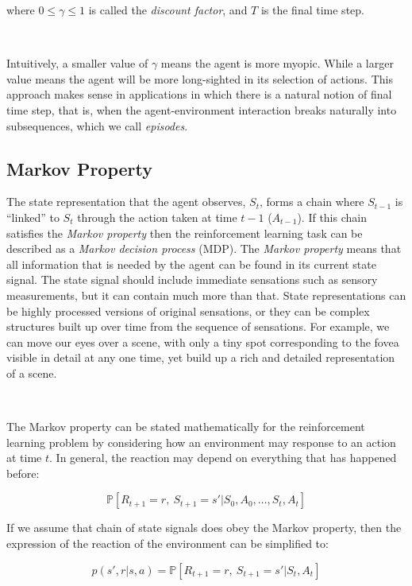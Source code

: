 \documentclass{article}
\begin{document}
where $0 \leq \gamma \leq 1$ is called the \textit{discount factor}, and $T$ is the final time step.

\

Intuitively, a smaller value of $\gamma$ means the agent is more myopic. While a larger value means the agent will be more long-sighted in its selection of actions. This approach makes sense in applications in which there is a natural notion of final time step, that is, when the agent-environment interaction breaks naturally into subsequences, which we call \textit{episodes}.

\subsection{Markov Property}

 The state representation that the agent observes, $S_t$, forms a chain where $S_{t-1}$ is ``linked'' to $S_t$ through the action taken at time $t - 1$ ($A_{t-1}$). If this chain satisfies the \textit{Markov property} then the reinforcement learning task can be described as a \textit{Markov decision process} (MDP). The \textit{Markov property} means that all information that is needed by the agent can be found in its current state signal. The state signal should include immediate sensations such as sensory measurements, but it can contain much more than that. State representations can be highly processed versions of original sensations, or they can be complex structures built up over time from the sequence of sensations. For example, we can move our eyes over a scene, with only a tiny spot corresponding to the fovea visible in detail at any one time, yet build up a rich and detailed representation of a scene. \citep{sutton2018reinforcement}
 
 \
 
 The Markov property can be stated mathematically for the reinforcement learning problem by considering how an environment may response to an action at time $t$. In general, the reaction may depend on everything that has happened before:
 
 \begin{equation}
 	\mathbb{P}[ R_{t+1} = r, \ S_{t+1} = s' | S_0, A_0, \hdots, S_t, A_t]
 \end{equation}
 
 If we assume that chain of state signals does obey the Markov property, then the expression of the reaction of the environment can be simplified to:
 
 \begin{equation}
 	p(s', r | s, a) = \mathbb{P}[ R_{t+1} = r, \ S_{t+1} = s' | S_t, A_t]
 \end{equation}
 
\end{document}
